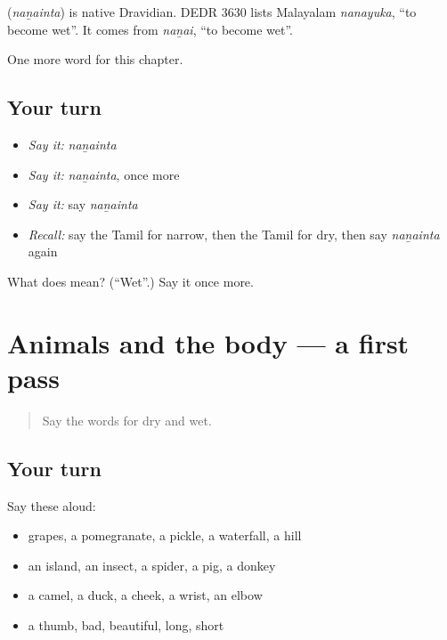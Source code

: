 \begin{cousinweb}
\textbf{} (\emph{naṉainta}) is native Dravidian. DEDR 3630 lists Malayalam \emph{nanayuka}, \textquotedblleft{}to become wet\textquotedblright{}. It comes from \emph{naṉai}, \textquotedblleft{}to become wet\textquotedblright{}.
\end{cousinweb}

\begin{grammarlens}[title={What you've built}]
One more word for this chapter.
\end{grammarlens}

\subsection*{Your turn}
\begin{itemize}
\raggedright
  \item \emph{Say it:} \emph{naṉainta}
  \item \emph{Say it:} \emph{naṉainta}, once more
  \item \emph{Say it:} say \emph{naṉainta}
  \item \emph{Recall:} say the Tamil for narrow, then the Tamil for dry, then say \emph{naṉainta} again
\end{itemize}

\begin{tcolorbox}[breakable,colback=teal!4,colframe=teal!35!black,title={Before you move on}]
What does  mean? (\textquotedblleft{}Wet\textquotedblright{}.) Say it once more.
\end{tcolorbox}
\section[(dialogue)]{Animals and the body — a first pass}

\label{lesson:TA-R148-first-pass-animals-and-the-body}



\begin{quote}
Say the words for dry and wet.
\end{quote}

\subsection*{Your turn}
Say these aloud:

\begin{itemize}
\raggedright
  \item grapes, a pomegranate, a pickle, a waterfall, a hill
  \item an island, an insect, a spider, a pig, a donkey
  \item a camel, a duck, a cheek, a wrist, an elbow
  \item a thumb, bad, beautiful, long, short
\end{itemize}


